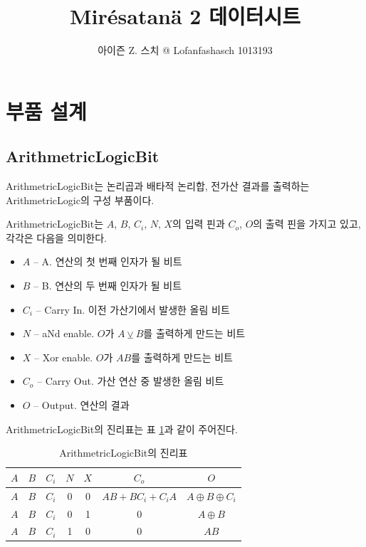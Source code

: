 \documentclass{article}
\title{Mirésatanä 2 데이터시트}
\author{아이즌 Z. 스치 @ Lofanfashasch 1013193}
\renewcommand{\tablename}{표}
\begin{document}
\maketitle
\tableofcontents

\pagebreak

\section{부품 설계}

\subsection{ArithmetricLogicBit}

ArithmetricLogicBit는 논리곱과 배타적 논리합,
전가산 결과를 출력하는 ArithmetricLogic의 구성 부품이다.

ArithmetricLogicBit는
$A$, $B$, $C_i$, $N$, $X$의 입력 핀과
$C_o$, $O$의 출력 핀을 가지고 있고,
각각은 다음을 의미한다.

\begin{itemize}
    \item $A$ -- A. 연산의 첫 번째 인자가 될 비트
    \item $B$ -- B. 연산의 두 번째 인자가 될 비트
    \item $C_i$ -- Carry In. 이전 가산기에서 발생한 올림 비트
    \item $N$ -- aNd enable. $O$가 $A \veebar B$를 출력하게 만드는 비트
    \item $X$ -- Xor enable. $O$가 $AB$를 출력하게 만드는 비트
    \item $C_o$ -- Carry Out. 가산 연산 중 발생한 올림 비트
    \item $O$ -- Output. 연산의 결과
\end{itemize}

ArithmetricLogicBit의 진리표는 \tablename{} \ref{tab:alb}과 같이 주어진다.

\begin{table}[h]
    \centering
    \begin{tabular}{ccccc|cc}
        $A$ & $B$ & $C_i$ & $N$ & $X$ & $C_o$ & $O$ \\
        \hline
        $A$ & $B$ & $C_i$ &  0 &  0 & $AB + BC_i + C_iA$ & $A \oplus B \oplus C_i$ \\
        $A$ & $B$ & $C_i$ &  0 &  1 &  0 & $A \oplus B$ \\
        $A$ & $B$ & $C_i$ &  1 &  0 &  0 & $AB$ \\
    \end{tabular}
    \caption{ArithmetricLogicBit의 진리표}
    \label{tab:alb}
\end{table}
\end{document}
